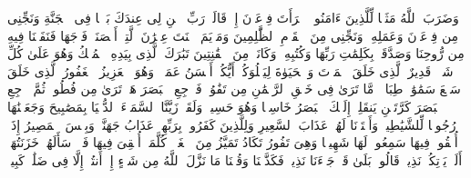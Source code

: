 وَضَرَبَ ٱللَّهُ مَثَلࣰا لِّلَّذِینَ ءَامَنُوا۟ ٱمۡرَأَتَ فِرۡعَوۡنَ إِذۡ قَالَتۡ رَبِّ ٱبۡنِ لِی عِندَكَ بَیۡتࣰا فِی ٱلۡجَنَّةِ وَنَجِّنِی مِن فِرۡعَوۡنَ وَعَمَلِهِۦ وَنَجِّنِی مِنَ ٱلۡقَوۡمِ ٱلظَّٰلِمِینَ%
\stopbuffer
\startbuffer[\q:66:12]
وَمَرۡیَمَ ٱبۡنَتَ عِمۡرَٰنَ ٱلَّتِیۤ أَحۡصَنَتۡ فَرۡجَهَا فَنَفَخۡنَا فِیهِ مِن رُّوحِنَا وَصَدَّقَتۡ بِكَلِمَٰتِ رَبِّهَا وَكُتُبِهِۦ وَكَانَتۡ مِنَ ٱلۡقَٰنِتِینَ%
\stopbuffer
\startbuffer[\q:67:1]
تَبَٰرَكَ ٱلَّذِی بِیَدِهِ ٱلۡمُلۡكُ وَهُوَ عَلَىٰ كُلِّ شَیۡءࣲ قَدِیرٌ%
\stopbuffer
\startbuffer[\q:67:2]
ٱلَّذِی خَلَقَ ٱلۡمَوۡتَ وَٱلۡحَیَوٰةَ لِیَبۡلُوَكُمۡ أَیُّكُمۡ أَحۡسَنُ عَمَلࣰاۚ وَهُوَ ٱلۡعَزِیزُ ٱلۡغَفُورُ%
\stopbuffer
\startbuffer[\q:67:3]
ٱلَّذِی خَلَقَ سَبۡعَ سَمَٰوَٰتࣲ طِبَاقࣰاۖ مَّا تَرَىٰ فِی خَلۡقِ ٱلرَّحۡمَٰنِ مِن تَفَٰوُتࣲۖ فَٱرۡجِعِ ٱلۡبَصَرَ هَلۡ تَرَىٰ مِن فُطُورࣲ%
\stopbuffer
\startbuffer[\q:67:4]
ثُمَّ ٱرۡجِعِ ٱلۡبَصَرَ كَرَّتَیۡنِ یَنقَلِبۡ إِلَیۡكَ ٱلۡبَصَرُ خَاسِئࣰا وَهُوَ حَسِیرࣱ%
\stopbuffer
\startbuffer[\q:67:5]
وَلَقَدۡ زَیَّنَّا ٱلسَّمَاۤءَ ٱلدُّنۡیَا بِمَصَٰبِیحَ وَجَعَلۡنَٰهَا رُجُومࣰا لِّلشَّیَٰطِینِۖ وَأَعۡتَدۡنَا لَهُمۡ عَذَابَ ٱلسَّعِیرِ%
\stopbuffer
\startbuffer[\q:67:6]
وَلِلَّذِینَ كَفَرُوا۟ بِرَبِّهِمۡ عَذَابُ جَهَنَّمَۖ وَبِئۡسَ ٱلۡمَصِیرُ%
\stopbuffer
\startbuffer[\q:67:7]
إِذَاۤ أُلۡقُوا۟ فِیهَا سَمِعُوا۟ لَهَا شَهِیقࣰا وَهِیَ تَفُورُ%
\stopbuffer
\startbuffer[\q:67:8]
تَكَادُ تَمَیَّزُ مِنَ ٱلۡغَیۡظِۖ كُلَّمَاۤ أُلۡقِیَ فِیهَا فَوۡجࣱ سَأَلَهُمۡ خَزَنَتُهَاۤ أَلَمۡ یَأۡتِكُمۡ نَذِیرࣱ%
\stopbuffer
\startbuffer[\q:67:9]
قَالُوا۟ بَلَىٰ قَدۡ جَاۤءَنَا نَذِیرࣱ فَكَذَّبۡنَا وَقُلۡنَا مَا نَزَّلَ ٱللَّهُ مِن شَیۡءٍ إِنۡ أَنتُمۡ إِلَّا فِی ضَلَٰلࣲ كَبِیرࣲ%
\stopbuffer
